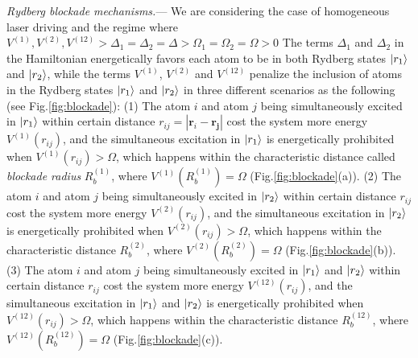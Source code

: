 \documentclass[%
 reprint,
nofootinbib,
 amsmath,amssymb,
 aps,
floatfix,
]{revtex4-2}
\begin{document}
\emph{Rydberg blockade mechanisms.}--- We are considering the case of homogeneous laser driving and the regime where $V^{(1)},V^{(2)},V^{(12)} > \Delta_1=\Delta_2 =\Delta > \Omega_1=\Omega_2=\Omega > 0$ The terms $\Delta_1$ and $\Delta_2$ in the Hamiltonian energetically favors each atom to be in both Rydberg states $\ket{r_1}$ and $\ket{r_2}$, while the terms $V^{(1)}$, $V^{(2)}$ and $V^{(12)}$ penalize the inclusion of atoms in the Rydberg states $\ket{r_1}$ and $\ket{r_2}$ in three different scenarios as the following (see Fig.\ref{fig:blockade}): (1) The atom $i$ and atom $j$ being simultaneously excited in $\ket{r_1}$ within certain distance $r_{ij}=|\boldsymbol{r}_i-\boldsymbol{r_j}|$ cost the system more energy $V^{(1)}(r_{ij})$, and the simultaneous excitation in $\ket{r_1}$ is energetically prohibited when $V^{(1)}(r_{ij})>\Omega$, which happens within the characteristic distance called \emph{blockade radius} $R^{(1)}_b$, where $V^{(1)}(R^{(1)}_b)=\Omega$ (Fig.\ref{fig:blockade}(a)). (2) The atom $i$ and atom $j$ being simultaneously excited in $\ket{r_2}$ within certain distance $r_{ij}$ cost the system more energy $V^{(2)}(r_{ij})$, and the simultaneous excitation in $\ket{r_2}$ is energetically prohibited when $V^{(2)}(r_{ij})>\Omega$, which happens within the characteristic distance $R^{(2)}_b$, where $V^{(2)}(R^{(2)}_b)=\Omega$ (Fig.\ref{fig:blockade}(b)). (3) The atom $i$ and atom $j$ being simultaneously excited in $\ket{r_1}$ and $\ket{r_2}$ within certain distance $r_{ij}$ cost the system more energy $V^{(12)}(r_{ij})$, and the simultaneous excitation in $\ket{r_1}$ and $\ket{r_2}$ is energetically prohibited when $V^{(12)}(r_{ij})>\Omega$, which happens within the characteristic distance $R^{(12)}_b$, where $V^{(12)}(R^{(12)}_b)=\Omega$ (Fig.\ref{fig:blockade}(c)).
\end{document}

